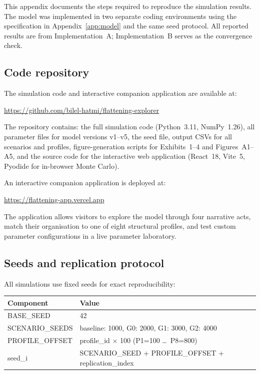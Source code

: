 \documentclass[11pt,a4paper]{article}
\begin{document}
\begin{appendices}
This appendix documents the steps required to reproduce the simulation
results. The model was implemented in two separate coding environments using
the specification in Appendix~\ref{app:model} and the same seed protocol.
All reported results are from Implementation~A; Implementation~B serves as
the convergence check.

\subsection{Code repository}\label{app:repro:code}

The simulation code and interactive companion application are available at:
\begin{center}
\url{https://github.com/bilel-hatmi/flattening-explorer}
\end{center}
The repository contains: the full simulation code (Python~3.11, NumPy~1.26),
all parameter files for model versions v1--v5, the seed file, output CSVs
for all scenarios and profiles, figure-generation scripts for
Exhibits~1--4 and Figures~A1--A5, and the source code for the interactive
web application (React~18, Vite~5, Pyodide for in-browser Monte Carlo).

An interactive companion application is deployed at:
\begin{center}
\url{https://flattening-app.vercel.app}
\end{center}
The application allows visitors to explore the model through four narrative
acts, match their organisation to one of eight structural profiles, and
test custom parameter configurations in a live parameter laboratory.

\subsection{Seeds and replication protocol}\label{app:repro:seeds}

All simulations use fixed seeds for exact reproducibility:

\begin{table}[H]
\centering\small\ttfamily
\setlength{\tabcolsep}{10pt}
\renewcommand{\arraystretch}{1.15}
\begin{tabular}{@{}ll@{}}
\toprule
\normalfont\textbf{Component} & \textbf{Value} \\
\midrule
BASE\_SEED        & 42 \\
SCENARIO\_SEEDS   & baseline: 1000, G0: 2000, G1: 3000, G2: 4000 \\
PROFILE\_OFFSET   & profile\_id $\times$ 100 \normalfont(P1=100 \ldots\ P8=800) \\
seed\_i           & SCENARIO\_SEED + PROFILE\_OFFSET + replication\_index \\
\bottomrule
\end{tabular}
\end{table}


\end{appendices}
\end{document}
